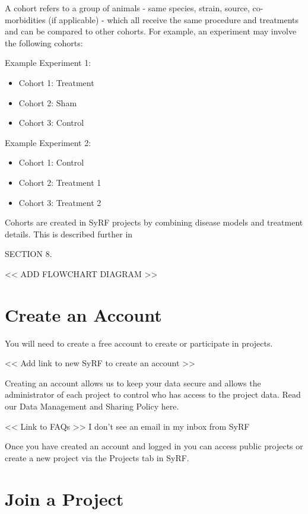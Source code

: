 \documentclass[
]{book}
\providecommand{\tightlist}{%
  \setlength{\itemsep}{0pt}\setlength{\parskip}{0pt}}
\begin{document}
A cohort refers to a group of animals - same species, strain, source, co-morbidities (if applicable) - which all receive the same procedure and treatments and can be compared to other cohorts. For example, an experiment may involve the following cohorts:

Example Experiment 1:

\begin{itemize}
\tightlist
\item
  Cohort 1: Treatment
\item
  Cohort 2: Sham
\item
  Cohort 3: Control
\end{itemize}

Example Experiment 2:

\begin{itemize}
\tightlist
\item
  Cohort 1: Control
\item
  Cohort 2: Treatment 1
\item
  Cohort 3: Treatment 2
\end{itemize}

Cohorts are created in SyRF projects by combining disease models and treatment details. This is described further in

SECTION 8.

\textless{}\textless{} ADD FLOWCHART DIAGRAM \textgreater{}\textgreater{}

\hypertarget{createAccount}{%
\chapter{Create an Account}\label{createAccount}}

You will need to create a free account to create or participate in projects.

\textless{}\textless{} Add link to new SyRF to create an account \textgreater{}\textgreater{}

Creating an account allows us to keep your data secure and allows the administrator of each project to control who has access to the project data. Read our Data Management and Sharing Policy here.

\textless{}\textless{} Link to FAQs \textgreater{}\textgreater{}
I don't see an email in my inbox from SyRF

Once you have created an account and logged in you can access public projects or create a new project via the Projects tab in SyRF.

\hypertarget{join}{%
\chapter{Join a Project}\label{join}}
\end{document}
